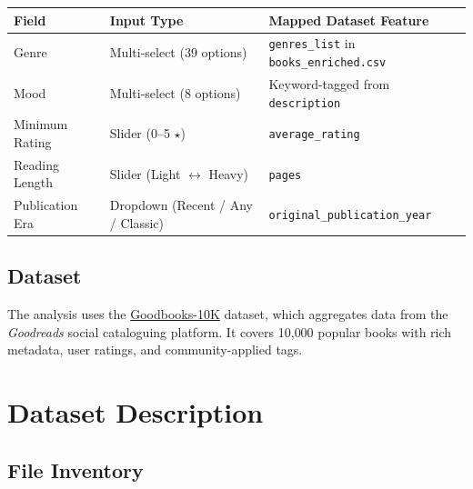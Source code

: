 \documentclass[12pt, a4paper]{article}
\newcommand{\code}[1]{\texttt{\small\color{shelfPurple}#1}}
\begin{document}
\begin{center}
\begin{tabular}{@{}lll@{}}
\toprule
\textbf{Field} & \textbf{Input Type} & \textbf{Mapped Dataset Feature} \\
\midrule
Genre & Multi-select (39 options) & \code{genres\_list} in \code{books\_enriched.csv} \\
Mood & Multi-select (8 options) & Keyword-tagged from \code{description} \\
Minimum Rating & Slider (0--5 $\star$) & \code{average\_rating} \\
Reading Length & Slider (Light $\leftrightarrow$ Heavy) & \code{pages} \\
Publication Era & Dropdown (Recent / Any / Classic) & \code{original\_publication\_year} \\
\bottomrule
\end{tabular}
\end{center}

\subsection{Dataset}
The analysis uses the \href{https://www.kaggle.com/datasets/zygmunt/goodbooks-10k}{Goodbooks-10K}
dataset, which aggregates data from the \emph{Goodreads} social cataloguing platform.
It covers 10{,}000 popular books with rich metadata, user ratings, and community-applied tags.

\section{Dataset Description}

\subsection{File Inventory}
\end{document}
